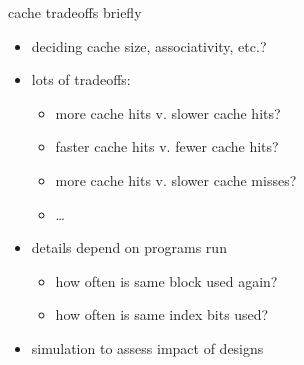 \begin{frame}{cache tradeoffs briefly}
    \begin{itemize}
    \item deciding cache size, associativity, etc.?
    \item lots of tradeoffs:
        \begin{itemize}
        \item more cache hits v. slower cache hits?
        \item faster cache hits v. fewer cache hits?
        \item more cache hits v. slower cache misses?
        \item \ldots
        \end{itemize}
    \item details depend on programs run
        \begin{itemize}
        \item how often is same block used again?
        \item how often is same index bits used?
        \end{itemize}
    \item simulation to assess impact of designs
    \end{itemize}
\end{frame}
